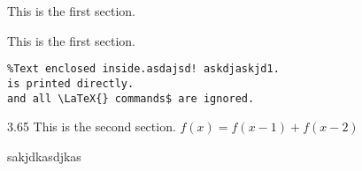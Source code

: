 This is the first section.




This is the first section.
\begin{verbatim}
%Text enclosed inside.asdajsd! askdjaskjd1.
is printed directly. 
and all \LaTeX{} commands$ are ignored.
\end{verbatim}
3.65
This is the second section.
$f(x)=f(x-1)+f(x-2)$




sakjdkasdjkas
